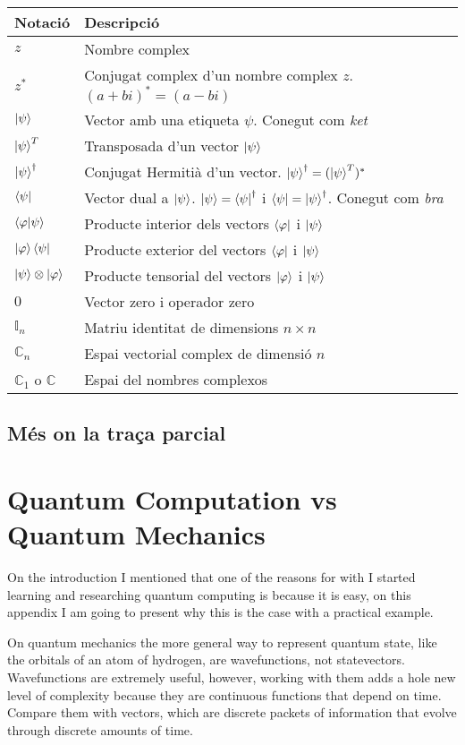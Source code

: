 \begin{tabular}{ p{2cm}|p{12cm} }
	\hline
	Notació & Descripció\\
	\hline
	\hline
	$z$ & Nombre complex    \\
	$z^{*}$ & Conjugat complex d'un nombre complex $z$. $(a+ bi)^{*} = (a -bi)$\\
	$\ket{\psi} $ & Vector amb una etiqueta $\psi$. Conegut com \textit{ket}\\
	$\ket{\psi}^T$ & Transposada d'un vector $\ket{\psi}$ \\
	$\ket{\psi}^\dag $ &  Conjugat Hermitià d'un vector. $\ket{\psi}^\dag = (\ket{\psi}^T)^* $\\
	$\bra{\psi} $ & Vector dual a $\ket{\psi}$. $ \ket{\psi} = \bra{\psi}^{\dag}$ i $\bra{\psi} = \ket{\psi}^\dag$. Conegut com \textit{bra}\\
	$ \bra{\varphi}\ket{\psi} $ & Producte interior dels vectors $\bra{\varphi}$ i $\ket{\psi}$ \\
	$ \ket{\varphi}\bra{\psi} $ & Producte exterior del vectors $\bra{\varphi}$ i $\ket{\psi}$ \\
	$ \ket{\psi}\otimes\ket{\varphi}$ & Producte tensorial del vectors $\ket{\varphi}$ i $\ket{\psi}$ \\
	$ 0 $ & Vector zero i operador zero \\
	$ \mathbb{I}_n $ & Matriu identitat de dimensions $n\times n$ \\
	$ \mathbb{C}_n $ & Espai vectorial complex de dimensió $n$ \\
	$ \mathbb{C}_1$ o $\mathbb{C} $ & Espai del nombres complexos \\
	
\end{tabular}
\section{Més on la traça parcial}

\chapter{Quantum Computation vs Quantum Mechanics}
On the introduction I mentioned that one of the reasons for with I started learning and researching quantum computing is because it is easy, on this appendix I am going to present why this is the case with a practical example.

On quantum mechanics the more general way to represent quantum state, like the orbitals of an atom of hydrogen, are wavefunctions, not statevectors. Wavefunctions are extremely useful, however, working with them adds a hole new level of complexity because they are continuous functions that depend on time. Compare them with vectors, which are discrete packets of information that evolve through discrete amounts of time.

